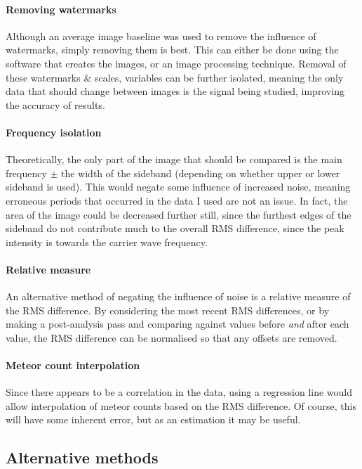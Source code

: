 \paragraph{Removing watermarks\\}
Although an average image baseline was used to remove the influence of watermarks, simply removing them is best. This can either be done using the software that creates the images, or an image processing technique. Removal of these watermarks \& scales, variables can be further isolated, meaning the only data that should change between images is the signal being studied, improving the accuracy of results.
\paragraph{Frequency isolation\\}
Theoretically, the only part of the image that should be compared is the main frequency $\pm$ the width of the sideband (depending on whether upper or lower sideband is used). This would negate some influence of increased noise, meaning erroneous periods that occurred in the data I used are not an issue. In fact, the area of the image could be decreased further still, since the furthest edges of the sideband do not contribute much to the overall RMS difference, since the peak intensity is towards the carrier wave frequency.
\paragraph{Relative measure\\}
An alternative method of negating the influence of noise is a relative measure of the RMS difference. By considering the most recent RMS differences, or by making a post-analysis pass and comparing against values before {\it and} after each value, the RMS difference can be normalised so that any offsets are removed.
\paragraph{Meteor count interpolation\\}
Since there appears to be a correlation in the data, using a regression line would allow interpolation of meteor counts based on the RMS difference. Of course, this will have some inherent error, but as an estimation it may be useful.
\subsection{Alternative methods}
